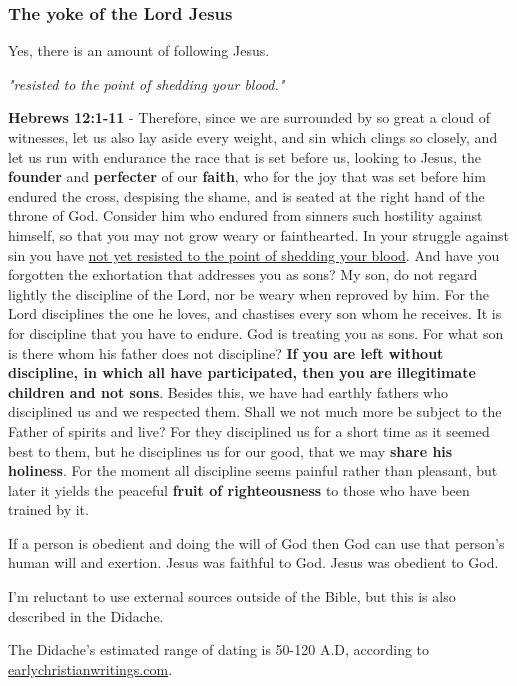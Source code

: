 \documentclass[11pt]{article}
\begin{document}
\subsubsection{The yoke of the Lord Jesus}
\label{sec:orgbd263a1}
Yes, there is an amount of following Jesus.

\emph{"resisted to the point of shedding your blood."}

\textbf{Hebrews 12:1-11} - Therefore, since we are surrounded by so great a cloud of witnesses, let us also lay aside every weight, and sin which clings so closely, and let us run with endurance the race that is set before us, looking to Jesus, the \textbf{founder} and \textbf{perfecter} of our \textbf{faith}, who for the joy that was set before him endured the cross, despising the shame, and is seated at the right hand of the throne of God. Consider him who endured from sinners such hostility against himself, so that you may not grow weary or fainthearted. In your struggle against sin you have \uline{not yet resisted to the point of shedding your blood}. And have you forgotten the exhortation that addresses you as sons? My son, do not regard lightly the discipline of the Lord, nor be weary when reproved by him. For the Lord disciplines the one he loves, and chastises every son whom he receives. It is for discipline that you have to endure. God is treating you as sons. For what son is there whom his father does not discipline? \textbf{If you are left without discipline, in which all have participated, then you are illegitimate children and not sons}. Besides this, we have had earthly fathers who disciplined us and we respected them. Shall we not much more be subject to the Father of spirits and live? For they disciplined us for a short time as it seemed best to them, but he disciplines us for our good, that we may \textbf{share his holiness}. For the moment all discipline seems painful rather than pleasant, but later it yields the peaceful \textbf{fruit of righteousness} to those who have been trained by it.

If a person is obedient and doing the will of God then God can use that person's human will and exertion. Jesus was faithful to God. Jesus was obedient to God.

I'm reluctant to use external sources outside of the Bible, but this is also described in the Didache.

The Didache's estimated range of dating is 50-120 A.D, according to \href{https://www.earlychristianwritings.com/text/didache-roberts.html}{earlychristianwritings.com}.
\end{document}
